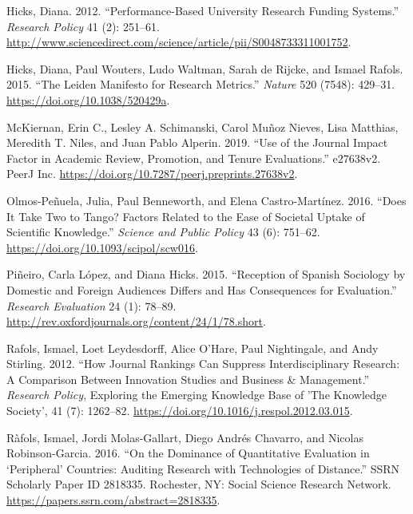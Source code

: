 \documentclass[]{elsarticle} %
\begin{document}
\leavevmode\hypertarget{ref-hicksPerformancebasedUniversityResearch2012}{}%
Hicks, Diana. 2012. ``Performance-Based University Research Funding
Systems.'' \emph{Research Policy} 41 (2): 251--61.
\url{http://www.sciencedirect.com/science/article/pii/S0048733311001752}.

\leavevmode\hypertarget{ref-hicksLeidenManifestoResearch2015}{}%
Hicks, Diana, Paul Wouters, Ludo Waltman, Sarah de Rijcke, and Ismael
Rafols. 2015. ``The Leiden Manifesto for Research Metrics.''
\emph{Nature} 520 (7548): 429--31.
\url{https://doi.org/10.1038/520429a}.

\leavevmode\hypertarget{ref-mckiernanUseJournalImpact2019}{}%
McKiernan, Erin C., Lesley A. Schimanski, Carol Muñoz Nieves, Lisa
Matthias, Meredith T. Niles, and Juan Pablo Alperin. 2019. ``Use of the
Journal Impact Factor in Academic Review, Promotion, and Tenure
Evaluations.'' e27638v2. PeerJ Inc.
\url{https://doi.org/10.7287/peerj.preprints.27638v2}.

\leavevmode\hypertarget{ref-olmos-penuelaDoesItTake2016}{}%
Olmos-Peñuela, Julia, Paul Benneworth, and Elena Castro-Martínez. 2016.
``Does It Take Two to Tango? Factors Related to the Ease of Societal
Uptake of Scientific Knowledge.'' \emph{Science and Public Policy} 43
(6): 751--62. \url{https://doi.org/10.1093/scipol/scw016}.

\leavevmode\hypertarget{ref-pineiroReceptionSpanishSociology2015}{}%
Piñeiro, Carla López, and Diana Hicks. 2015. ``Reception of Spanish
Sociology by Domestic and Foreign Audiences Differs and Has Consequences
for Evaluation.'' \emph{Research Evaluation} 24 (1): 78--89.
\url{http://rev.oxfordjournals.org/content/24/1/78.short}.

\leavevmode\hypertarget{ref-rafolsHowJournalRankings2012}{}%
Rafols, Ismael, Loet Leydesdorff, Alice O'Hare, Paul Nightingale, and
Andy Stirling. 2012. ``How Journal Rankings Can Suppress
Interdisciplinary Research: A Comparison Between Innovation Studies and
Business \& Management.'' \emph{Research Policy}, Exploring the Emerging
Knowledge Base of 'The Knowledge Society', 41 (7): 1262--82.
\url{https://doi.org/10.1016/j.respol.2012.03.015}.

\leavevmode\hypertarget{ref-rafolsDominanceQuantitativeEvaluation2016}{}%
Ràfols, Ismael, Jordi Molas-Gallart, Diego Andrés Chavarro, and Nicolas
Robinson-Garcia. 2016. ``On the Dominance of Quantitative Evaluation in
`Peripheral' Countries: Auditing Research with Technologies of
Distance.'' SSRN Scholarly Paper ID 2818335. Rochester, NY: Social
Science Research Network.
\url{https://papers.ssrn.com/abstract=2818335}.
\end{document}
